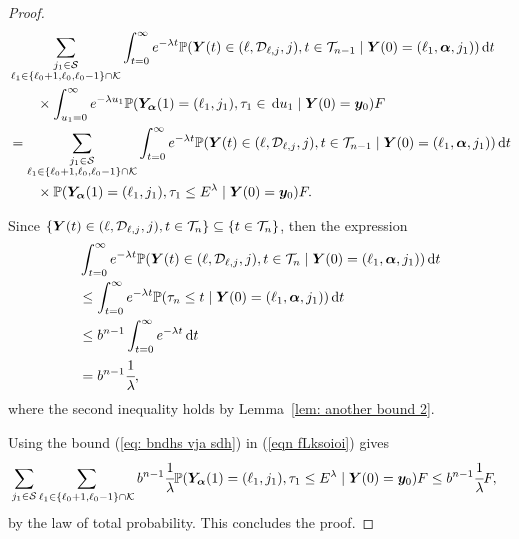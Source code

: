 \begin{proof}
	\begin{align}
		&\sum_{\substack{j_1\in\mathcal S\\\ell_1\in\{\ell_0+1,\ell_0,\ell_0-1\}\cap\mathcal K}}\int_{t=0}^\infty e^{-\lambda t} \mathbb P({\boldsymbol Y}(t) \in (\ell,\mathcal D_{\ell,j},j), t\in\mathcal T_{n-1} \nonumber
		\mid \boldsymbol Y(0)=(\ell_1,\boldsymbol \alpha, j_1)) \, \mathrm{d} t 
		\\&\qquad{}\times\int_{u_1=0}^\infty e^{-\lambda u_1}\mathbb P(\bm{Y}_{\bm{\alpha}}(1)=(\ell_1,j_1), \tau_1\in \, \mathrm{d} u_1
		\mid \boldsymbol Y(0)=\boldsymbol y_0)F  \nonumber 
		\\&=\sum_{\substack{j_1\in\mathcal S\\\ell_1\in\{\ell_0+1,\ell_0,\ell_0-1\}\cap\mathcal K}}\int_{t=0}^\infty e^{-\lambda t} \mathbb P({\boldsymbol Y}(t) \in (\ell,\mathcal D_{\ell,j},j), t\in\mathcal T_{n-1} \nonumber
		\mid \boldsymbol Y(0)=(\ell_1,\boldsymbol\alpha,j_1)) \, \mathrm{d} t 
		\\&\qquad{}\times\mathbb P(\bm{Y}_{\bm{\alpha}}(1)=(\ell_1,j_1), \tau_1\leq E^\lambda
		\mid \boldsymbol Y(0)=\boldsymbol y_0)F. \label{eqn fLksoioi}
	\end{align}
	
	Since \(\{\boldsymbol Y(t)\in(\ell,\mathcal{D}_{\ell,j},j),t\in\mathcal T_n\}\subseteq \{t\in\mathcal T_n\}\), then the expression 
	\begin{align}
		&\int_{t=0}^\infty e^{-\lambda t} \mathbb P( {\boldsymbol Y}(t) \in (\ell,\mathcal D_{\ell,j},j), t\in\mathcal T_n\nonumber
		\mid \boldsymbol Y(0)=(\ell_1,\boldsymbol \alpha,j_1)) \, \mathrm{d} t
		\\&\leq \int_{t=0}^\infty e^{-\lambda t} \mathbb P(\tau_{n}\leq t \nonumber
		\mid \boldsymbol Y(0)=(\ell_1,\boldsymbol\alpha,j_1)) \, \mathrm{d} t
		\\&\leq b^{n-1}\int_{t=0}^\infty e^{-\lambda t} \, \mathrm{d} t \nonumber 
		\\&=b^{n-1}\cfrac{1}{\lambda}, \label{eq: bndhs vja sdh}
	\end{align}
	where the second inequality holds by Lemma~\ref{lem: another bound 2}.
	
	Using the bound (\ref{eq: bndhs vja sdh}) in (\ref{eqn fLksoioi}) gives 
	\begin{align}
		&\sum_{j_1\in\mathcal S}\sum_{\ell_1\in\{\ell_0+1,\ell_0-1\}\cap\mathcal K} b^{n-1}\cfrac{1}{\lambda} 
		\mathbb P(\bm{Y}_{\bm{\alpha}}(1)=(\ell_1,j_1), \tau_1\leq E^\lambda
		\mid \boldsymbol Y(0)=\boldsymbol y_0)F\leq b^{n-1}\cfrac{1}{\lambda}F, \label{eqn fLksoioi2}
	\end{align}
	by the law of total probability. This concludes the proof. 
\end{proof}

